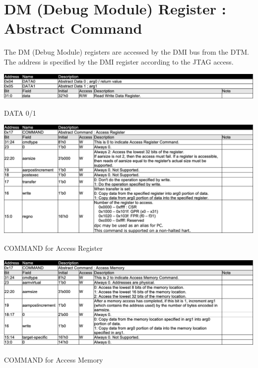 \section{DM (Debug Module) Register : Abstract Command}

The DM (Debug Module) registers are accessed by the DMI bus from the DTM. The address is specified by the DMI register according to the JTAG access.

\begin{table}[H]
    \includegraphics[width=1.00\columnwidth]{./Table/DM_ABSCMD_DATA.png}
    \caption{DATA 0/1}
    \label{tb:DM_ABSCMD_DATA}
\end{table}

\begin{table}[H]
    \includegraphics[width=1.00\columnwidth]{./Table/DM_ABSCMD_CMD_REG.png}
    \caption{COMMAND for Access Register}
    \label{tb:DM_ABSCMD_CMD_REG}
\end{table}

\begin{table}[H]
    \includegraphics[width=1.00\columnwidth]{./Table/DM_ABSCMD_CMD_MEM.png}
    \caption{COMMAND for Access Memory}
    \label{tb:DM_ABSCMD_CMD_MEM}
\end{table}

